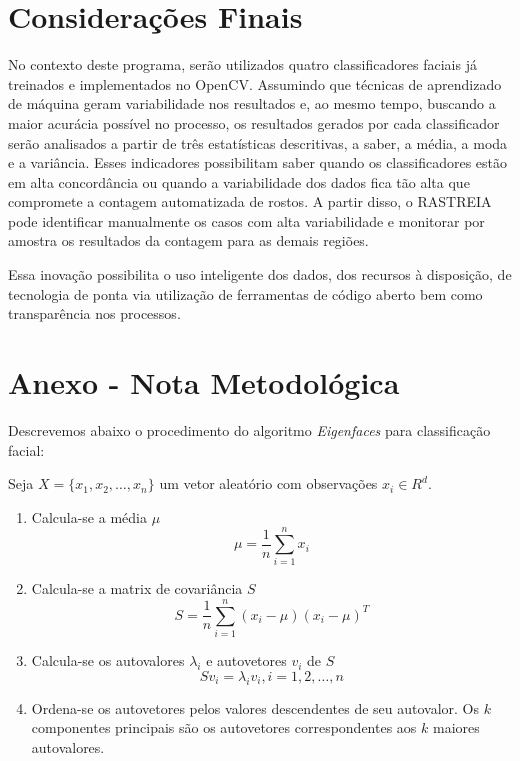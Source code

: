 \documentclass[a4paper, 12pt, openright, oneside, english, brazil, article]{abntex2}
\begin{document}
	\section*{Considerações Finais}
	
	No contexto deste programa, serão utilizados quatro classificadores faciais já treinados e implementados no OpenCV. Assumindo que técnicas de aprendizado de máquina geram variabilidade nos resultados e, ao mesmo tempo, buscando a maior acurácia possível no processo, os resultados gerados por cada classificador serão analisados a partir de três estatísticas descritivas, a saber, a média, a moda e a variância. Esses indicadores possibilitam saber quando os classificadores estão em alta concordância ou quando a variabilidade dos dados fica tão alta que compromete a contagem automatizada de rostos. A partir disso, o RASTREIA pode identificar manualmente os casos com alta variabilidade e monitorar por amostra os resultados da contagem para as demais regiões.
	
	Essa inovação possibilita o uso inteligente dos dados, dos recursos à disposição, de tecnologia de ponta via utilização de ferramentas de código aberto bem como transparência nos processos.
	
	
	\newpage
	\postextual
	\anexos
	\section*{Anexo - Nota Metodológica}
	Descrevemos abaixo o procedimento do algoritmo \textit{Eigenfaces} para classificação facial:
	
	Seja $X = \{x_1, x_2, \ldots, x_n\}$ um vetor aleatório com observações $x_i \in R^d$.
	
	\begin{enumerate}
		\item Calcula-se a média $\mu$
		$$\mu = \frac{1}{n} \sum_{i=1}^{n}x_i$$
		
		\item Calcula-se a matrix de covariância $S$
		$$S = \frac{1}{n} \sum_{i=1}^{n}(x_i - \mu)(x_i - \mu)^T$$
		
		\item Calcula-se os autovalores $\lambda_i$ e autovetores $v_i$ de $S$
		$$Sv_i = \lambda_iv_i, i=1,2,\ldots,n$$
		
		\item Ordena-se os autovetores pelos valores descendentes de seu autovalor. Os $k$ componentes principais são os autovetores correspondentes aos $k$ maiores autovalores.		
	\end{enumerate}
\end{document}

